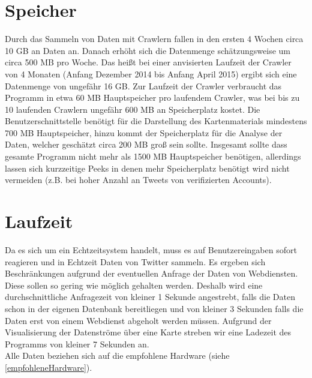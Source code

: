 ﻿%
\section{Speicher}
Durch das Sammeln von Daten mit Crawlern fallen in den ersten 4 Wochen circa 10 GB an Daten an. Danach erhöht sich die Datenmenge schätzungsweise um circa 500 MB pro Woche. Das heißt bei einer anvisierten Laufzeit der Crawler von 4 Monaten (Anfang Dezember 2014 bis Anfang April 2015) ergibt sich eine Datenmenge von ungefähr 16 GB.
Zur Laufzeit der Crawler verbraucht das Programm in etwa 60 MB Hauptspeicher pro laufendem Crawler, was bei bis zu 10 laufenden Crawlern ungefähr 600 MB an Speicherplatz kostet.
Die Benutzerschnittstelle benötigt für die Darstellung des Kartenmaterials mindestens 700 MB Hauptspeicher, hinzu kommt der Speicherplatz für die Analyse der Daten, welcher geschätzt circa 200 MB groß sein sollte.
Insgesamt sollte dass gesamte Programm nicht mehr als 1500 MB Hauptspeicher benötigen, allerdings lassen sich kurzzeitige Peeks in denen mehr Speicherplatz benötigt wird nicht vermeiden (z.B. bei hoher Anzahl an Tweets von verifizierten Accounts).
\section{Laufzeit}
Da es sich um ein Echtzeitsystem handelt, muss es auf Benutzereingaben sofort reagieren und in Echtzeit Daten von Twitter sammeln. Es ergeben sich Beschränkungen aufgrund der eventuellen Anfrage der Daten von Webdiensten. Diese sollen so gering wie möglich gehalten werden. Deshalb wird eine durchschnittliche Anfragezeit von kleiner 1 Sekunde angestrebt, falls die Daten schon in der eigenen Datenbank bereitliegen und von kleiner 3 Sekunden falls die Daten erst von einem Webdienst abgeholt werden müssen.
Aufgrund der Visualisierung der Datenströme über eine Karte streben wir eine Ladezeit des Programms von kleiner 7 Sekunden an.
\\
Alle Daten beziehen sich auf die empfohlene Hardware (siehe \ref{empfohleneHardware}).